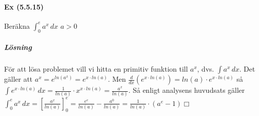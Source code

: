 \paragraph{Ex (5.5.15)} Beräkna $\int_0^e a^x\, dx$ $a>0$
\subparagraph{Lösning}
För att lösa problemet vill vi hitta en primitiv funktion till $a^x$,
dvs. $\int a^x\, dx$.
Det gäller att $a^x=e^{ln(a^x)}=e^{x\cdot ln(a)}$. Men $\frac{d}{dx}(e^{x\cdot ln(a)})=ln(a)\cdot e^{x\cdot ln(a)}$
så $\int e^{x\cdot ln(a)}\, dx= \frac{1}{ln(a)}\cdot x^{x\cdot ln(a)}=\frac{a^x}{ln(a)}$.
Så enligt analysens huvudsats gäller $\int_0^e a^x\, dx=[\frac{a^x}{ln(a)}]_0^e=\frac{e^e}{ln(a)}-\frac{a^0}{ln(a)}=\frac{1}{ln(a)}\cdot (a^e-1) \Box$